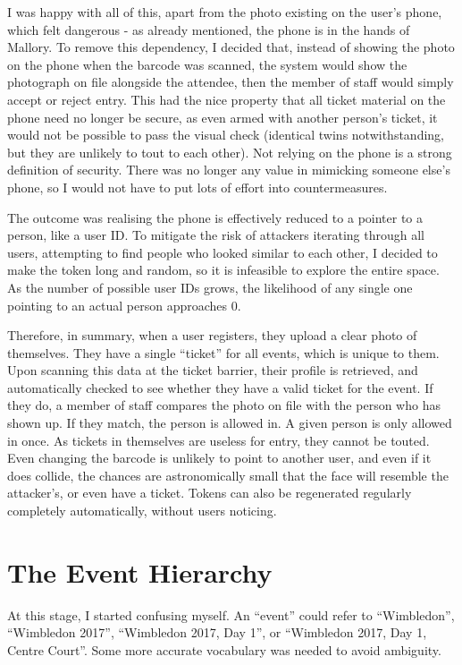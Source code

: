 \documentclass[12pt,a4paper]{bhamdissertation}
\begin{document}
I was happy with all of this, apart from the photo existing on the user's phone, which felt dangerous - as already mentioned, the phone is in the hands of Mallory. To remove this dependency, I decided that, instead of showing the photo on the phone when the barcode was scanned, the system would show the photograph on file alongside the attendee, then the member of staff would simply accept or reject entry. This had the nice property that all ticket material on the phone need no longer be secure, as even armed with another person's ticket, it would not be possible to pass the visual check (identical twins notwithstanding, but they are unlikely to tout to each other). Not relying on the phone is a strong definition of security. There was no longer any value in mimicking someone else's phone, so I would not have to put lots of effort into countermeasures.

The outcome was realising the phone is effectively reduced to a pointer to a person, like a user ID. To mitigate the risk of attackers iterating through all users, attempting to find people who looked similar to each other, I decided to make the token long and random, so it is infeasible to explore the entire space. As the number of possible user IDs grows, the likelihood of any single one pointing to an actual person approaches 0.

Therefore, in summary, when a user registers, they upload a clear photo of themselves. They have a single ``ticket'' for all events, which is unique to them. Upon scanning this data at the ticket barrier, their profile is retrieved, and automatically checked to see whether they have a valid ticket for the event. If they do, a member of staff compares the photo on file with the person who has shown up. If they match, the person is allowed in. A given person is only allowed in once. As tickets in themselves are useless for entry, they cannot be touted. Even changing the barcode is unlikely to point to another user, and even if it does collide, the chances are astronomically small that the face will resemble the attacker's, or even have a ticket. Tokens can also be regenerated regularly completely automatically, without users noticing.

\section{The Event Hierarchy}

At this stage, I started confusing myself. An ``event'' could refer to ``Wimbledon'', ``Wimbledon 2017'', ``Wimbledon 2017, Day 1'', or ``Wimbledon 2017, Day 1, Centre Court''. Some more accurate vocabulary was needed to avoid ambiguity.
\end{document}
